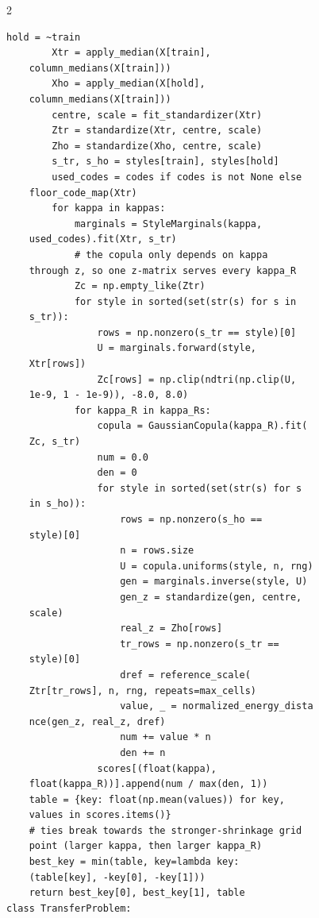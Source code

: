 \begin{multicols}{2}
\begin{Verbatim}[fontsize=\scriptsize]
        hold = ~train
        Xtr = apply_median(X[train],
    column_medians(X[train]))
        Xho = apply_median(X[hold],
    column_medians(X[train]))
        centre, scale = fit_standardizer(Xtr)
        Ztr = standardize(Xtr, centre, scale)
        Zho = standardize(Xho, centre, scale)
        s_tr, s_ho = styles[train], styles[hold]
        used_codes = codes if codes is not None else
    floor_code_map(Xtr)
        for kappa in kappas:
            marginals = StyleMarginals(kappa,
    used_codes).fit(Xtr, s_tr)
            # the copula only depends on kappa
    through z, so one z-matrix serves every kappa_R
            Zc = np.empty_like(Ztr)
            for style in sorted(set(str(s) for s in
    s_tr)):
                rows = np.nonzero(s_tr == style)[0]
                U = marginals.forward(style,
    Xtr[rows])
                Zc[rows] = np.clip(ndtri(np.clip(U,
    1e-9, 1 - 1e-9)), -8.0, 8.0)
            for kappa_R in kappa_Rs:
                copula = GaussianCopula(kappa_R).fit(
    Zc, s_tr)
                num = 0.0
                den = 0
                for style in sorted(set(str(s) for s
    in s_ho)):
                    rows = np.nonzero(s_ho ==
    style)[0]
                    n = rows.size
                    U = copula.uniforms(style, n, rng)
                    gen = marginals.inverse(style, U)
                    gen_z = standardize(gen, centre,
    scale)
                    real_z = Zho[rows]
                    tr_rows = np.nonzero(s_tr ==
    style)[0]
                    dref = reference_scale(
    Ztr[tr_rows], n, rng, repeats=max_cells)
                    value, _ = normalized_energy_dista
    nce(gen_z, real_z, dref)
                    num += value * n
                    den += n
                scores[(float(kappa),
    float(kappa_R))].append(num / max(den, 1))
    table = {key: float(np.mean(values)) for key,
    values in scores.items()}
    # ties break towards the stronger-shrinkage grid
    point (larger kappa, then larger kappa_R)
    best_key = min(table, key=lambda key:
    (table[key], -key[0], -key[1]))
    return best_key[0], best_key[1], table
class TransferProblem:


\end{Verbatim}
\end{multicols}
